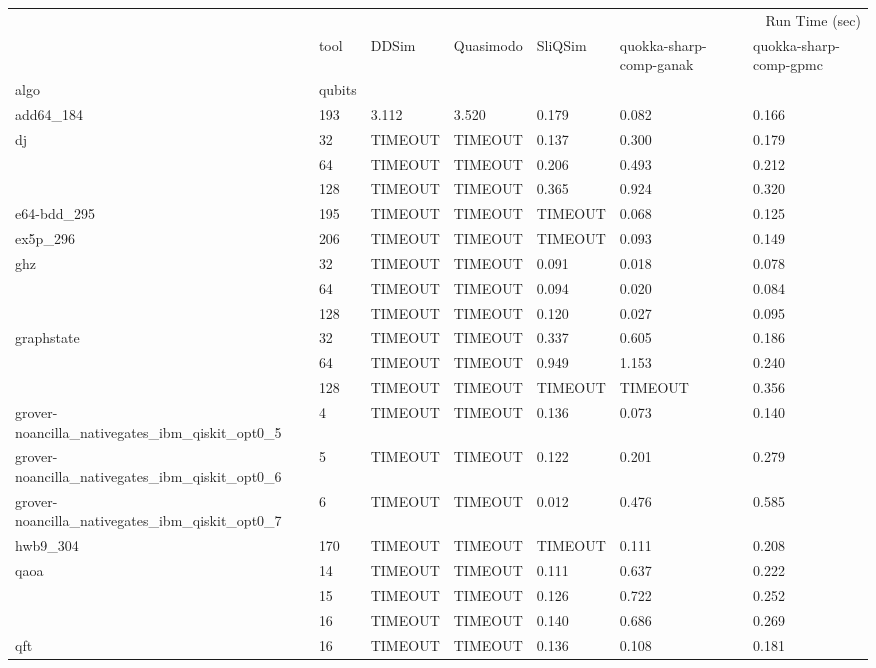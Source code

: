 \begin{tabular}{lllllll}
\toprule
 &  & \multicolumn{5}{r}{Run Time (sec)} \\
 & tool & DDSim & Quasimodo & SliQSim & quokka-sharp-comp-ganak & quokka-sharp-comp-gpmc \\
algo & qubits &  &  &  &  &  \\
\midrule
add64_184 & 193 & 3.112 & 3.520 & 0.179 & 0.082 & 0.166 \\
\cline{1-7}
\multirow[t]{3}{*}{dj} & 32 & TIMEOUT & TIMEOUT & 0.137 & 0.300 & 0.179 \\
 & 64 & TIMEOUT & TIMEOUT & 0.206 & 0.493 & 0.212 \\
 & 128 & TIMEOUT & TIMEOUT & 0.365 & 0.924 & 0.320 \\
\cline{1-7}
e64-bdd_295 & 195 & TIMEOUT & TIMEOUT & TIMEOUT & 0.068 & 0.125 \\
\cline{1-7}
ex5p_296 & 206 & TIMEOUT & TIMEOUT & TIMEOUT & 0.093 & 0.149 \\
\cline{1-7}
\multirow[t]{3}{*}{ghz} & 32 & TIMEOUT & TIMEOUT & 0.091 & 0.018 & 0.078 \\
 & 64 & TIMEOUT & TIMEOUT & 0.094 & 0.020 & 0.084 \\
 & 128 & TIMEOUT & TIMEOUT & 0.120 & 0.027 & 0.095 \\
\cline{1-7}
\multirow[t]{3}{*}{graphstate} & 32 & TIMEOUT & TIMEOUT & 0.337 & 0.605 & 0.186 \\
 & 64 & TIMEOUT & TIMEOUT & 0.949 & 1.153 & 0.240 \\
 & 128 & TIMEOUT & TIMEOUT & TIMEOUT & TIMEOUT & 0.356 \\
\cline{1-7}
grover-noancilla_nativegates_ibm_qiskit_opt0_5 & 4 & TIMEOUT & TIMEOUT & 0.136 & 0.073 & 0.140 \\
\cline{1-7}
grover-noancilla_nativegates_ibm_qiskit_opt0_6 & 5 & TIMEOUT & TIMEOUT & 0.122 & 0.201 & 0.279 \\
\cline{1-7}
grover-noancilla_nativegates_ibm_qiskit_opt0_7 & 6 & TIMEOUT & TIMEOUT & 0.012 & 0.476 & 0.585 \\
\cline{1-7}
hwb9_304 & 170 & TIMEOUT & TIMEOUT & TIMEOUT & 0.111 & 0.208 \\
\cline{1-7}
\multirow[t]{3}{*}{qaoa} & 14 & TIMEOUT & TIMEOUT & 0.111 & 0.637 & 0.222 \\
 & 15 & TIMEOUT & TIMEOUT & 0.126 & 0.722 & 0.252 \\
 & 16 & TIMEOUT & TIMEOUT & 0.140 & 0.686 & 0.269 \\
\cline{1-7}
\multirow[t]{3}{*}{qft} & 16 & TIMEOUT & TIMEOUT & 0.136 & 0.108 & 0.181 \\

\end{tabular}
